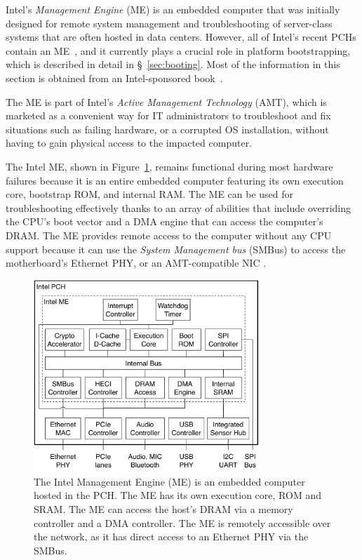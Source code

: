 Intel's \textit{Management Engine} (ME) is an embedded computer that was
initially designed for remote system management and troubleshooting of
server-class systems that are often hosted in data centers. However, all of
Intel's recent PCHs contain an ME~\cite{intel2013mefw}, and it currently plays
a crucial role in platform bootstrapping, which is described in detail in
\S~\ref{sec:booting}. Most of the information in this section is obtained from
an Intel-sponsored book~\cite{ruan2014intelme}.

The ME is part of Intel's \textit{Active Management Technology} (AMT), which is
marketed as a convenient way for IT administrators to troubleshoot and fix
situations such as failing hardware, or a corrupted OS installation, without
having to gain physical access to the impacted computer.

The Intel ME, shown in Figure~\ref{fig:intel_me}, remains functional during
most hardware failures because it is an entire embedded computer featuring its
own execution core, bootstrap ROM, and internal RAM. The ME can be used for
troubleshooting effectively thanks to an array of abilities that include
overriding the CPU's boot vector and a DMA engine that can access the
computer's DRAM. The ME provides remote access to the computer without any CPU
support because it can use the \textit{System Management bus} (SMBus) to access
the motherboard's Ethernet PHY, or an AMT-compatible NIC
\cite{intel2015chipset}.

\begin{figure}[hbt]
  \centering
  \includegraphics[width=85mm]{figures/intel_me.pdf}
  \caption{
    The Intel Management Engine (ME) is an embedded computer hosted in the
    PCH. The ME has its own execution core, ROM and SRAM. The ME can access the
    host's DRAM via a memory controller and a DMA controller. The ME is
    remotely accessible over the network, as it has direct access to an
    Ethernet PHY via the SMBus.
  }
  \label{fig:intel_me}
\end{figure}

